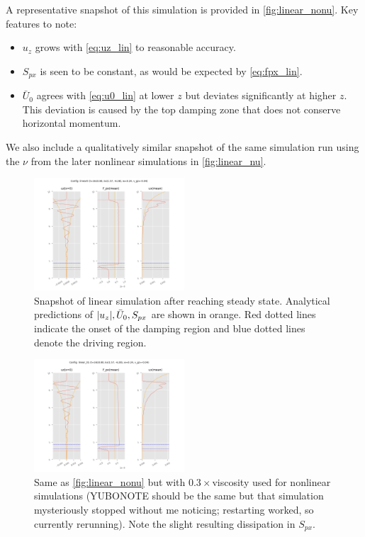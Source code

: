 \documentclass[twocolumn,
        nofootinbib,
        usenames, %
        dvipsnames %
    ]{revtex4-1}%
\DeclarePairedDelimiter\abs{\lvert}{\rvert}
\begin{document}
A representative snapshot of this simulation
is provided in \autoref{fig:linear_nonu}. Key features to note:
\begin{itemize}
    \item $u_z$ grows with \autoref{eq:uz_lin} to reasonable accuracy.

    \item $S_{px}$ is seen to be constant, as would be expected by
        \autoref{eq:fpx_lin}.

    \item $\bar{U}_0$ agrees with \autoref{eq:u0_lin} at lower $z$ but deviates
        significantly at higher $z$. This deviation is caused by the top damping
        zone that does not conserve horizontal momentum.
\end{itemize}
We also include a qualitatively similar snapshot of the same simulation run
using the $\nu$ from the later nonlinear simulations in \autoref{fig:linear_nu}.
\begin{figure}[h]
    \centering
    \includegraphics[width=0.5\textwidth]{plots/linear_nonu.png}
    \caption{Snapshot of linear simulation after reaching steady state.
        Analytical predictions of $\abs*{u_z}, \bar{U}_0, S_{px}$ are shown in
        orange. Red dotted lines indicate the onset of the damping region and
        blue dotted lines denote the driving region.}\label{fig:linear_nonu}
\end{figure}
\begin{figure}[h]
    \centering
    \includegraphics[width=0.5\textwidth]{plots/linear_nu.png}
    \caption{Same as \autoref{fig:linear_nonu} but with $0.3\times $viscosity
    used for nonlinear simulations (YUBONOTE should be the same but that
    simulation mysteriously stopped without me noticing; restarting worked, so
    currently rerunning). Note the slight resulting dissipation in $S_{px}$.
    }\label{fig:linear_nu}
\end{figure}
\end{document}
